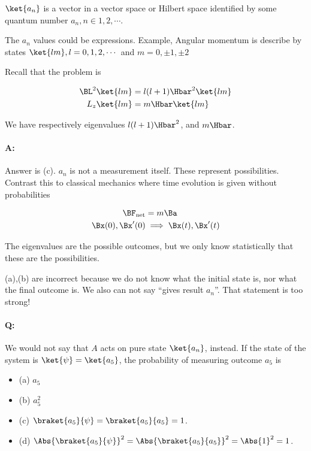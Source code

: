 $\ket{a_n}$ is a vector in a vector space or Hilbert space identified by some quantum number $a_n, n \in 1,2, \cdots$.

The $a_n$ values could be expressions.  Example, Angular momentum is describe by states $\ket{lm}, l = 0,1,2,\cdots$ and $m = 0, \pm 1, \pm 2$

Recall that the problem is

\begin{align}\label{eqn:PHY356HNov2:10}
\BL^2 \ket{lm} &= l(l+1) \Hbar^2 \ket{lm} \\
L_z \ket{lm} &= m \Hbar \ket{lm}
\end{align}

We have respectively eigenvalues $l(l+1)\Hbar^2$, and $m \Hbar$.

\paragraph{A:} Answer is (c).  $a_n$ is not a measurement itself.  These represent possibilities.  Contrast this to classical mechanics where time evolution is given without probabilities

\begin{align}\label{eqn:PHY356HNov2:20}
\BF_{\text{net}} &= m \Ba \\
\Bx(0), \Bx'(0) &\implies \Bx(t), \Bx'(t)
\end{align}

The eigenvalues are the possible outcomes, but we only know statistically that these are the possibilities.

(a),(b) are incorrect because we do not know what the initial state is, nor what the final outcome is.  We also can not say ``gives result $a_n$''.  That statement is too strong!

\paragraph{Q:} We would not say that $A$ acts on pure state $\ket{a_n}$, instead.  If the state of the system is $\ket{\psi} = \ket{a_5}$, the probability of measuring outcome $a_5$ is
\begin{itemize}
\item (a) $a_5$
\item (b) $a_5^2$
\item (c) $\braket{a_5}{\psi} = \braket{a_5}{a_5} = 1$.
\item (d) $\Abs{\braket{a_5}{\psi}}^2 = \Abs{\braket{a_5}{a_5}}^2 = \Abs{1}^2 = 1$.
\end{itemize}

